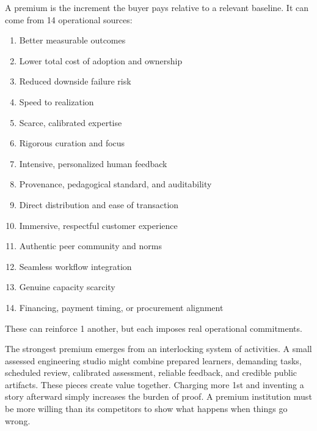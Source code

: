 A premium is the increment the buyer pays relative to a relevant baseline. It can come from 14 operational sources:
\begin{enumerate}
  \item Better measurable outcomes
  \item Lower total cost of adoption and ownership
  \item Reduced downside failure risk
  \item Speed to realization
  \item Scarce, calibrated expertise
  \item Rigorous curation and focus
  \item Intensive, personalized human feedback
  \item Provenance, pedagogical standard, and auditability
  \item Direct distribution and ease of transaction
  \item Immersive, respectful customer experience
  \item Authentic peer community and norms
  \item Seamless workflow integration
  \item Genuine capacity scarcity
  \item Financing, payment timing, or procurement alignment
\end{enumerate}
These can reinforce 1 another, but each imposes real operational commitments.

The strongest premium emerges from an interlocking system of activities. A small assessed engineering studio might combine prepared learners, demanding tasks, scheduled review, calibrated assessment, reliable feedback, and credible public artifacts. These pieces create value together. Charging more 1st and inventing a story afterward simply increases the burden of proof. A premium institution must be more willing than its competitors to show what happens when things go wrong.
